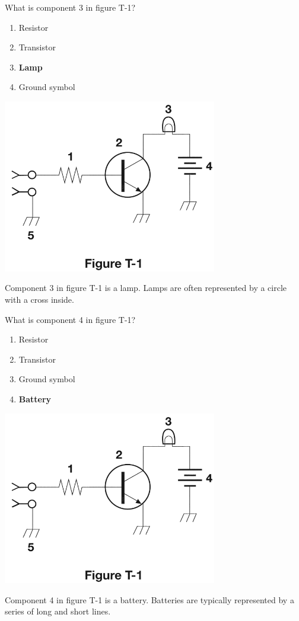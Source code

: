\begin{tcolorbox}[
    colback=gray!10!white,
    colframe=black!75!black,
    title={T6C04},
    sidebyside,
    sidebyside align=top,
    lefthand width=0.45\textwidth
]
What is component 3 in figure T-1?
\begin{enumerate}[label=\Alph*),noitemsep]
    \item Resistor
    \item Transistor
    \item \textbf{Lamp}
    \item Ground symbol
\end{enumerate}
\tcblower
\includegraphics[width=0.7\textwidth]{images/t1.png}
\end{tcolorbox}
Component 3 in figure T-1 is a lamp. Lamps are often represented by a circle with a cross inside.

\begin{tcolorbox}[
    colback=gray!10!white,
    colframe=black!75!black,
    title={T6C05},
    sidebyside,
    sidebyside align=top,
    lefthand width=0.45\textwidth
]
What is component 4 in figure T-1?
\begin{enumerate}[label=\Alph*),noitemsep]
    \item Resistor
    \item Transistor
    \item Ground symbol
    \item \textbf{Battery}
\end{enumerate}
\tcblower
\includegraphics[width=0.7\textwidth]{images/t1.png}
\end{tcolorbox}
Component 4 in figure T-1 is a battery. Batteries are typically represented by a series of long and short lines.



